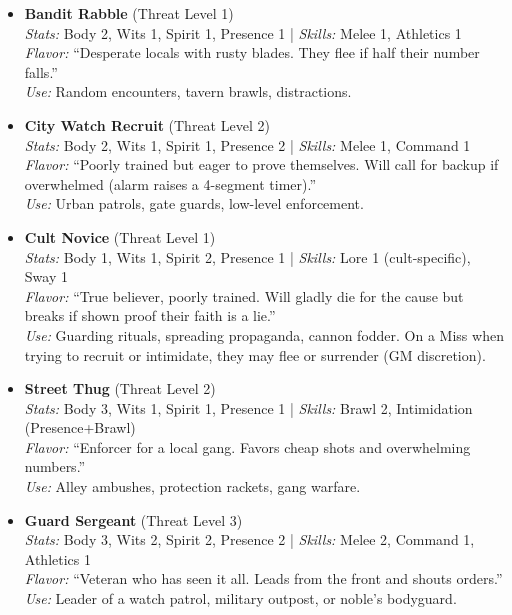 \begin{itemize}
    \item \textbf{Bandit Rabble} (Threat Level 1) \\
    \textit{Stats:} Body 2, Wits 1, Spirit 1, Presence 1 \quad | \quad \textit{Skills:} Melee 1, Athletics 1 \\
    \textit{Flavor:} ``Desperate locals with rusty blades. They flee if half their number falls.'' \\
    \textit{Use:} Random encounters, tavern brawls, distractions.

    \item \textbf{City Watch Recruit} (Threat Level 2) \\
    \textit{Stats:} Body 2, Wits 1, Spirit 1, Presence 2 \quad | \quad \textit{Skills:} Melee 1, Command 1 \\
    \textit{Flavor:} ``Poorly trained but eager to prove themselves. Will call for backup if overwhelmed (alarm raises a 4-segment timer).'' \\
    \textit{Use:} Urban patrols, gate guards, low-level enforcement.

    \item \textbf{Cult Novice} (Threat Level 1) \\
    \textit{Stats:} Body 1, Wits 1, Spirit 2, Presence 1 \quad | \quad \textit{Skills:} Lore 1 (cult-specific), Sway 1 \\
    \textit{Flavor:} ``True believer, poorly trained. Will gladly die for the cause but breaks if shown proof their faith is a lie.'' \\
    \textit{Use:} Guarding rituals, spreading propaganda, cannon fodder. On a Miss when trying to recruit or intimidate, they may flee or surrender (GM discretion).

    \item \textbf{Street Thug} (Threat Level 2) \\
    \textit{Stats:} Body 3, Wits 1, Spirit 1, Presence 1 \quad | \quad \textit{Skills:} Brawl 2, Intimidation (Presence+Brawl) \\
    \textit{Flavor:} ``Enforcer for a local gang. Favors cheap shots and overwhelming numbers.'' \\
    \textit{Use:} Alley ambushes, protection rackets, gang warfare.

    \item \textbf{Guard Sergeant} (Threat Level 3) \\
    \textit{Stats:} Body 3, Wits 2, Spirit 2, Presence 2 \quad | \quad \textit{Skills:} Melee 2, Command 1, Athletics 1 \\
    \textit{Flavor:} ``Veteran who has seen it all. Leads from the front and shouts orders.'' \\
    \textit{Use:} Leader of a watch patrol, military outpost, or noble's bodyguard.
\end{itemize}

